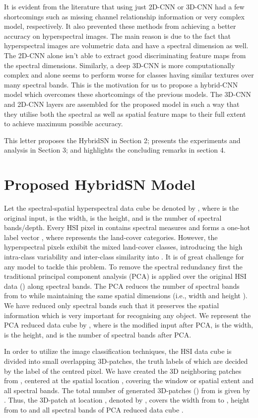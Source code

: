 \documentclass[journal]{IEEEtran}
\begin{document}
It is evident from the literature that using just 2D-CNN or 3D-CNN had a few shortcomings such as missing channel relationship information or very complex model, respectively. It also prevented these methods from achieving a better accuracy on hyperspectral images. The main reason is due to the fact that hyperspectral images are volumetric data and have a spectral dimension as well. The 2D-CNN alone isn't able to extract good discriminating feature maps from the spectral dimensions. Similarly, a deep 3D-CNN is more computationally complex and alone seems to perform worse for classes having similar textures over many spectral bands. This is the motivation for us to propose a hybrid-CNN model which overcomes these shortcomings of the previous models. The 3D-CNN and 2D-CNN layers are assembled for the proposed model in such a way that they utilise both the spectral as well as spatial feature maps to their full extent to achieve maximum possible accuracy.

This letter proposes the HybridSN in Section 2; presents the experiments and analysis in Section 3; and highlights the concluding remarks in section 4.




\section{Proposed HybridSN Model}
Let the spectral-spatial hyperspectral data cube be denoted by , where  is the original input,  is the width,  is the height, and  is the number of spectral bands/depth. Every HSI pixel in  
contains  spectral measures and forms a one-hot label vector , where  represents the land-cover categories. However, the hyperspectral pixels exhibit the mixed land-cover classes, introducing the high intra-class variability and inter-class similarity into . It is of great challenge for any model to tackle this problem. 
To remove the spectral redundancy first the traditional principal component analysis (PCA) is applied over the original HSI data () along spectral bands. The PCA reduces the number of spectral bands from  to  while maintaining the same spatial dimensions (i.e., width  and height ). We have reduced only spectral bands such that it preserves the spatial information which is very important for recognising any object. We represent the PCA reduced data cube by , where   is the modified input after PCA,  is the width,  is the height, and  is the number of spectral bands after PCA.

In order to utilize the image classification techniques, the HSI data cube is divided into small overlapping 3D-patches, the truth labels of which are decided by the label of the centred pixel. We have created the 3D neighboring patches  from , centered at the spatial location , covering the  window or spatial extent and all  spectral bands. The total number of generated 3D-patches () from  is given by .
Thus, the 3D-patch at location , denoted by , covers the width from  to , height from  to  and all  spectral bands of PCA reduced data cube .
\end{document}
